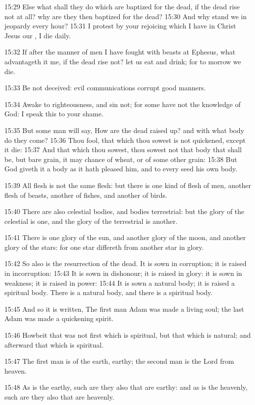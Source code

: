 15:29 Else what shall they do which are baptized for the dead, if the dead rise not at all? why are they then baptized for the dead?  15:30 And why stand we in jeopardy every hour?  15:31 I protest by your rejoicing which I have in Christ Jesus our \LORD, I die daily.

15:32 If after the manner of men I have fought with beasts at Ephesus, what advantageth it me, if the dead rise not? let us eat and drink; for to morrow we die.

15:33 Be not deceived: evil communications corrupt good manners.

15:34 Awake to righteousness, and sin not; for some have not the knowledge of God: I speak this to your shame.

15:35 But some man will say, How are the dead raised up? and with what body do they come?  15:36 Thou fool, that which thou sowest is not quickened, except it die: 15:37 And that which thou sowest, thou sowest not that body that shall be, but bare grain, it may chance of wheat, or of some other grain: 15:38 But God giveth it a body as it hath pleased him, and to every seed his own body.

15:39 All flesh is not the same flesh: but there is one kind of flesh of men, another flesh of beasts, another of fishes, and another of birds.

15:40 There are also celestial bodies, and bodies terrestrial: but the glory of the celestial is one, and the glory of the terrestrial is another.

15:41 There is one glory of the sun, and another glory of the moon, and another glory of the stars: for one star differeth from another star in glory.

15:42 So also is the resurrection of the dead. It is sown in corruption; it is raised in incorruption: 15:43 It is sown in dishonour; it is raised in glory: it is sown in weakness; it is raised in power: 15:44 It is sown a natural body; it is raised a spiritual body. There is a natural body, and there is a spiritual body.

15:45 And so it is written, The first man Adam was made a living soul; the last Adam was made a quickening spirit.

15:46 Howbeit that was not first which is spiritual, but that which is natural; and afterward that which is spiritual.

15:47 The first man is of the earth, earthy; the second man is the Lord from heaven.

15:48 As is the earthy, such are they also that are earthy: and as is the heavenly, such are they also that are heavenly.

